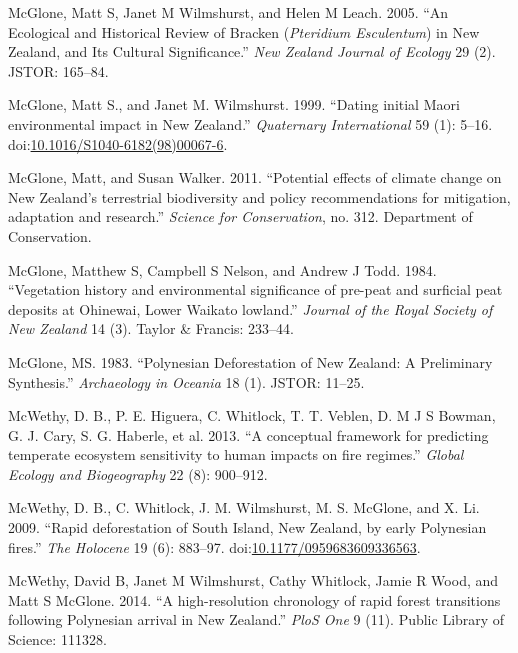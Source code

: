 \hypertarget{ref-Wilmshurst2005}{}
McGlone, Matt S, Janet M Wilmshurst, and Helen M Leach. 2005. ``An
Ecological and Historical Review of Bracken (\emph{Pteridium
Esculentum}) in New Zealand, and Its Cultural Significance.'' \emph{New
Zealand Journal of Ecology} 29 (2). JSTOR: 165--84.

\hypertarget{ref-McGlone1999}{}
McGlone, Matt S., and Janet M. Wilmshurst. 1999. ``Dating initial Maori
environmental impact in New Zealand.'' \emph{Quaternary International}
59 (1): 5--16.
doi:\href{https://doi.org/10.1016/S1040-6182(98)00067-6}{10.1016/S1040-6182(98)00067-6}.

\hypertarget{ref-mcglone2011potential}{}
McGlone, Matt, and Susan Walker. 2011. ``Potential effects of climate
change on New Zealand's terrestrial biodiversity and policy
recommendations for mitigation, adaptation and research.'' \emph{Science
for Conservation}, no. 312. Department of Conservation.

\hypertarget{ref-mcglone1984vegetation}{}
McGlone, Matthew S, Campbell S Nelson, and Andrew J Todd. 1984.
``Vegetation history and environmental significance of pre-peat and
surficial peat deposits at Ohinewai, Lower Waikato lowland.''
\emph{Journal of the Royal Society of New Zealand} 14 (3). Taylor \&
Francis: 233--44.

\hypertarget{ref-McGlone1983}{}
McGlone, MS. 1983. ``Polynesian Deforestation of New Zealand: A
Preliminary Synthesis.'' \emph{Archaeology in Oceania} 18 (1). JSTOR:
11--25.

\hypertarget{ref-Mcwethy2013}{}
McWethy, D. B., P. E. Higuera, C. Whitlock, T. T. Veblen, D. M J S
Bowman, G. J. Cary, S. G. Haberle, et al. 2013. ``A conceptual framework
for predicting temperate ecosystem sensitivity to human impacts on fire
regimes.'' \emph{Global Ecology and Biogeography} 22 (8): 900--912.

\hypertarget{ref-McWethy2009a}{}
McWethy, D. B., C. Whitlock, J. M. Wilmshurst, M. S. McGlone, and X. Li.
2009. ``Rapid deforestation of South Island, New Zealand, by early
Polynesian fires.'' \emph{The Holocene} 19 (6): 883--97.
doi:\href{https://doi.org/10.1177/0959683609336563}{10.1177/0959683609336563}.

\hypertarget{ref-mcwethy2014high}{}
McWethy, David B, Janet M Wilmshurst, Cathy Whitlock, Jamie R Wood, and
Matt S McGlone. 2014. ``A high-resolution chronology of rapid forest
transitions following Polynesian arrival in New Zealand.'' \emph{PloS
One} 9 (11). Public Library of Science: 111328.

